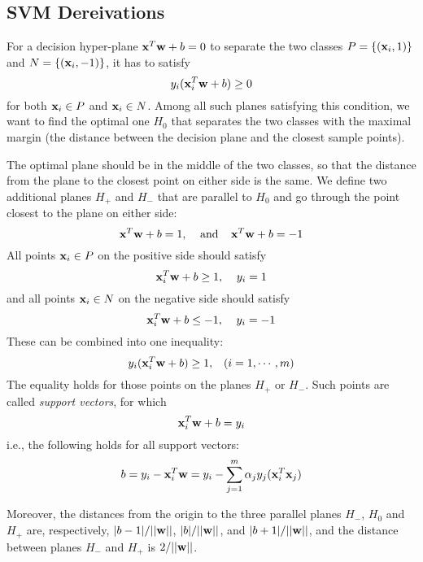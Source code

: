 \subsection*{SVM Dereivations}

For a decision hyper-plane ${\bf x}^T {\bf w}+b=0$ to separate the two 
classes $P=\{({\bf x}_i,1)\}$ and $N=\{({\bf x}_i,-1)\}$, it has to
satisfy
\[ 
y_i ({\bf x}_i^T{\bf w}+b) \ge 0	
\]
for both ${\bf x}_i \in P$ and ${\bf x}_i \in N$. Among all such planes 
satisfying this condition, we want to find the optimal one $H_0$ that 
separates the two classes with the maximal margin (the distance between 
the decision plane and the closest sample points).

The optimal plane should be in the middle of the two classes, so that 
the distance from the plane to the closest point on either side is the 
same. We define two additional planes $H_+$ and $H_-$ that are parallel
to $H_0$ and go through the point closest to the plane on either side:
\[
  {\bf x}^T {\bf w}+b=1,\;\;\;\;\mbox{and}\;\;\;\;{\bf x}^T {\bf w}+b=-1	
\]
All points ${\bf x}_i \in P$ on the positive side should satisfy 
\[ 
  {\bf x}_i^T {\bf w}+b \ge 1,\;\;\;\;y_i=1	
\]
and all points ${\bf x}_i \in N$ on the negative side should satisfy
\[ 
  {\bf x}_i^T {\bf w}+b \le -1,\;\;\;\; y_i=-1	
\]
These can be combined into one inequality:
\[
y_i ({\bf x}_i^T{\bf w} +b) \ge 1,\;\;\;(i=1,\cdots,m)	
\]
The equality holds for those points on the planes $H_+$ or $H_-$. Such
points are called {\em support vectors}, for which 
\[ 
  {\bf x}_i^T {\bf w}+b = y_i	
\]
i.e., the following holds for all support vectors:
\[
b=y_i-{\bf x}_i^T {\bf w}=y_i-\sum_{j=1}^m  \alpha_j y_j ({\bf x}_i^T {\bf x}_j)	
\]

Moreover, the distances from the origin to the three parallel planes $H_-$, 
$H_0$ and $H_+$ are, respectively, $|b-1|/||{\bf w}||$, $|b|/||{\bf w}||$, 
and $|b+1|/||{\bf w}||$, and the distance between planes $H_-$ and $H_+$ is
$2/||{\bf w}||$. 


